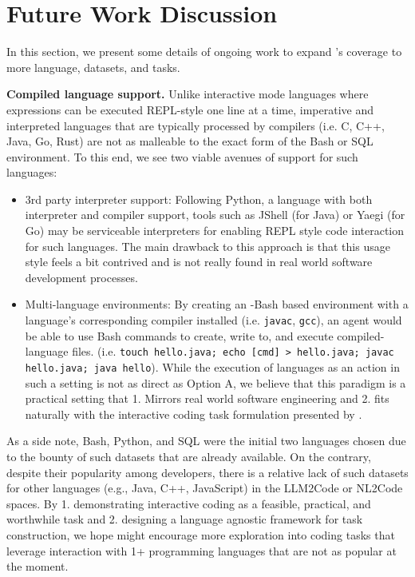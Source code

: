 

\section{Future Work Discussion}
In this section, we present some details of ongoing work to expand \benchmark{}'s coverage to more language, datasets, and tasks.

\textbf{Compiled language support.} Unlike interactive mode languages where expressions can be executed REPL-style one line at a time, imperative and interpreted languages that are typically processed by compilers (i.e. C, C++, Java, Go, Rust) are not as malleable to the exact form of the Bash or SQL environment.
To this end, we see two viable avenues of support for such languages:

\begin{itemize}[noitemsep,topsep=0pt]
    \item 3rd party interpreter support: Following Python, a language with both interpreter and compiler support, tools such as JShell (for Java) or Yaegi (for Go) may be serviceable interpreters for enabling REPL style code interaction for such languages. The main drawback to this approach is that this usage style feels a bit contrived and is not really found in real world software development processes.
    \item Multi-language environments: By creating an \benchmark{}-Bash based environment with a language’s corresponding compiler installed (i.e. \texttt{javac}, \texttt{gcc}), an agent would be able to use Bash commands to create, write to, and execute compiled-language files. (i.e. \texttt{touch hello.java; echo [cmd] > hello.java; javac hello.java; java hello}). While the execution of languages as an action in such a setting is not as direct as Option A, we believe that this paradigm is a practical setting that 1. Mirrors real world software engineering and 2. fits naturally with the interactive coding task formulation presented by \benchmark{}.
\end{itemize}

As a side note, Bash, Python, and SQL were the initial two languages chosen due to the bounty of such datasets that are already available.
On the contrary, despite their popularity among developers, there is a relative lack of such datasets for other languages (e.g., Java, C++, JavaScript) in the LLM2Code or NL2Code spaces. By 1. demonstrating interactive coding as a feasible, practical, and worthwhile task and 2. designing a language agnostic framework for task construction, we hope \benchmark{} might encourage more exploration into coding tasks that leverage interaction with 1+ programming languages that are not as popular at the moment.

